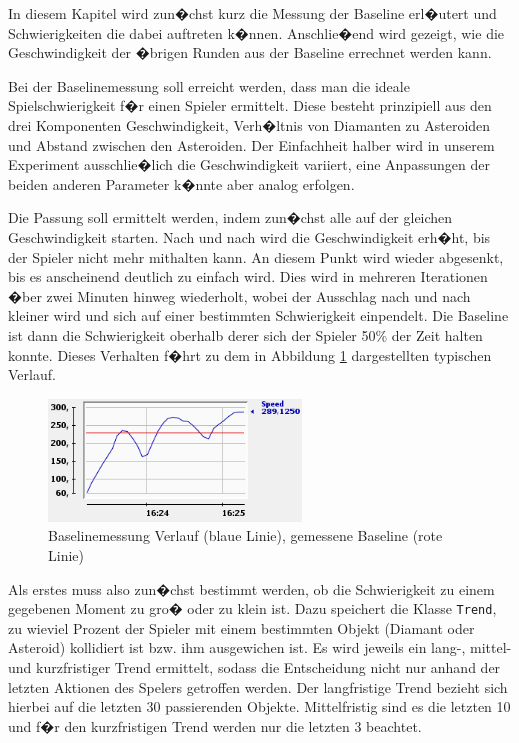 \documentclass[a4paper,12pt]{scrartcl}
\begin{document}
In diesem Kapitel wird zun�chst kurz die Messung der Baseline erl�utert und
Schwierigkeiten die dabei auftreten k�nnen. Anschlie�end wird gezeigt, wie die
Geschwindigkeit der �brigen Runden aus der Baseline errechnet werden kann.

Bei der Baselinemessung soll erreicht werden, dass man die ideale Spielschwierigkeit f�r
einen Spieler ermittelt. Diese besteht prinzipiell aus den drei Komponenten Geschwindigkeit,
Verh�ltnis von Diamanten zu Asteroiden und Abstand zwischen den Asteroiden. Der
Einfachheit halber wird in unserem Experiment ausschlie�lich die Geschwindigkeit variiert,
eine Anpassungen der beiden anderen Parameter k�nnte aber analog erfolgen.

Die Passung soll ermittelt werden, indem zun�chst alle auf der gleichen Geschwindigkeit
starten. Nach und nach wird die Geschwindigkeit erh�ht, bis der Spieler nicht mehr mithalten
kann. An diesem Punkt wird wieder abgesenkt, bis es anscheinend deutlich zu einfach
wird. Dies wird in mehreren Iterationen �ber zwei Minuten hinweg wiederholt, wobei
der Ausschlag nach und nach kleiner wird und sich auf einer bestimmten Schwierigkeit
einpendelt. Die Baseline ist dann die Schwierigkeit oberhalb derer sich der
Spieler 50\% der Zeit halten konnte. Dieses Verhalten f�hrt zu dem in Abbildung \ref{fig:Baseline} dargestellten typischen
Verlauf.

\begin{figure}[htp]
\begin{center}
  \includegraphics[width=0.6\textwidth]{Baseline.png}
  \caption[Baselinemessungsverlauf]{Baselinemessung Verlauf (blaue Linie),
  gemessene Baseline (rote Linie)}
  \label{fig:Baseline}
\end{center}
\end{figure} 

Als erstes muss also zun�chst bestimmt werden, ob die Schwierigkeit zu einem gegebenen
Moment zu gro� oder zu klein ist. Dazu speichert die Klasse \texttt{Trend}, zu wieviel Prozent der Spieler mit einem bestimmten Objekt (Diamant oder Asteroid) kollidiert ist bzw. ihm ausgewichen ist. Es wird jeweils ein lang-, mittel- und kurzfristiger Trend ermittelt, sodass die Entscheidung nicht nur anhand der letzten Aktionen des Spelers getroffen werden.
Der langfristige Trend bezieht sich hierbei auf die letzten 30 passierenden Objekte.
Mittelfristig sind es die letzten 10 und f�r den kurzfristigen Trend werden nur die letzten 3 beachtet.
\end{document}
